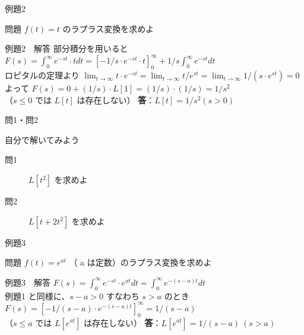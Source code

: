 \documentclass[professionalfonts]{beamer}
\begin{document}
\begin{frame}{例題2}
  \begin{exampleblock}{問題}
    $f(t) = t$ のラプラス変換を求めよ\\[2pt]
  \end{exampleblock}
\end{frame}

\begin{frame}{例題2　解答}
  部分積分を用いると\\[4pt]
  $F(s) = \int_{0}^\infty e^{-st}\cdot t dt = [-1/s \cdot e^{-st} \cdot t]_{0}^\infty + 1/s \int_{0}^\infty e^{-st} dt$\\[4pt]
  ロピタルの定理より $\lim_{t \to \infty} t\cdot e^{-st} = \lim_{t \to \infty} t/e^{st} = \lim_{t \to \infty} 1/(s\cdot e^{st}) = 0$\\[4pt]
  よって $F(s) = 0 + (1/s)\cdot L[1] = (1/s)\cdot(1/s) = 1/s^{2}$\\[4pt]
  （$s \leq 0$ では $L[t]$ は存在しない）
  \medskip\textbf{答}：$L[t] = 1/s^{2}  (s > 0)$
\end{frame}

\begin{frame}{問1・問2}
  \begin{exampleblock}{自分で解いてみよう}
  \begin{description}
    \item[問1] $L[t^2]$ を求めよ
    \item[問2] $L[t + 2t^2]$ を求めよ
  \end{description}
  \end{exampleblock}
\end{frame}

\begin{frame}{例題3}
  \begin{exampleblock}{問題}
    $f(t) = e^{at}$ （ a は定数）のラプラス変換を求めよ\\[2pt]
  \end{exampleblock}
\end{frame}

\begin{frame}{例題3　解答}
  $F(s) = \int_{0}^\infty e^{-st} \cdot e^{at} dt = \int_{0}^\infty e^{-(s-a)t} dt$\\[4pt]
  例題1 と同様に、$s-a > 0$ すなわち $s > a$ のとき\\[4pt]
  $F(s) = [-1/(s-a) \cdot e^{-(s-a)t}]_{0}^\infty = 1/(s-a)$\\[4pt]
  （$s \leq a$ では $L[e^{at}]$ は存在しない）
  \medskip\textbf{答}：$L[e^{at}] = 1/(s-a) \ (s > a)$
\end{frame}
\end{document}
